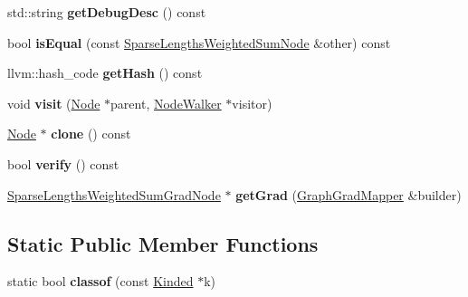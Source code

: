 \begin{DoxyCompactItemize}
std\+::string {\bfseries get\+Debug\+Desc} () const
\item 
\mbox{\label{classglow_1_1_sparse_lengths_weighted_sum_node_a6a3169aeafd0a72f4e3183a6894499b6}} 
bool {\bfseries is\+Equal} (const \hyperlink{classglow_1_1_sparse_lengths_weighted_sum_node}{Sparse\+Lengths\+Weighted\+Sum\+Node} \&other) const
\item 
\mbox{\label{classglow_1_1_sparse_lengths_weighted_sum_node_a54211ff407d80cf0be56092098af7f91}} 
llvm\+::hash\+\_\+code {\bfseries get\+Hash} () const
\item 
\mbox{\label{classglow_1_1_sparse_lengths_weighted_sum_node_a3d5983e3ef11deb31adcc2df4e14ec7c}} 
void {\bfseries visit} (\hyperlink{classglow_1_1_node}{Node} $\ast$parent, \hyperlink{classglow_1_1_node_walker}{Node\+Walker} $\ast$visitor)
\item 
\mbox{\label{classglow_1_1_sparse_lengths_weighted_sum_node_a15f9de7e7a0788041fcc7872b25b8a7a}} 
\hyperlink{classglow_1_1_node}{Node} $\ast$ {\bfseries clone} () const
\item 
\mbox{\label{classglow_1_1_sparse_lengths_weighted_sum_node_ae76ae3ea2bffa53689aa17dfcbc7949e}} 
bool {\bfseries verify} () const
\item 
\mbox{\label{classglow_1_1_sparse_lengths_weighted_sum_node_a5c877294fde9ab1c5fed0ae4366d8bb1}} 
\hyperlink{classglow_1_1_sparse_lengths_weighted_sum_grad_node}{Sparse\+Lengths\+Weighted\+Sum\+Grad\+Node} $\ast$ {\bfseries get\+Grad} (\hyperlink{classglow_1_1_graph_grad_mapper}{Graph\+Grad\+Mapper} \&builder)
\end{DoxyCompactItemize}
\subsection*{Static Public Member Functions}
\begin{DoxyCompactItemize}
\item 
\mbox{\label{classglow_1_1_sparse_lengths_weighted_sum_node_af35cd828a48dfa7baeaac1d29a146b83}} 
static bool {\bfseries classof} (const \hyperlink{classglow_1_1_kinded}{Kinded} $\ast$k)
\end{DoxyCompactItemize}
